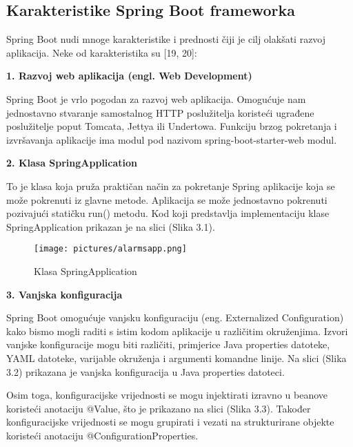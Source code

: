 \documentclass[times, utf8, zavrsni]{fer}
\begin{document}
\subsection{Karakteristike Spring Boot frameworka}
Spring Boot nudi mnoge karakteristike i prednosti čiji je cilj olakšati razvoj aplikacija. Neke od karakteristika su [19, 20]:

\vspace{\baselineskip}

 \textbf{1. Razvoj web aplikacija (engl. Web Development)}
 
 Spring Boot je vrlo pogodan za razvoj web aplikacija. Omogućuje nam jednostavno stvaranje samostalnog HTTP poslužitelja koristeći ugrađene poslužitelje poput Tomcata, Jettya ili Undertowa. Funkciju brzog pokretanja i izvršavanja aplikacije ima modul pod nazivom spring-boot-starter-web modul.

 \vspace{\baselineskip}
\newpage
 \textbf{2. Klasa SpringApplication}
 
 To je klasa koja pruža praktičan način za pokretanje Spring aplikacije koja se može pokrenuti iz glavne metode. Aplikacija se može jednostavno pokrenuti pozivajući statičku run() metodu. Kod koji predstavlja implementaciju klase SpringApplication prikazan je na slici (Slika 3.1).
 
\begin{figure}[h]
			\texttt{[image: pictures/alarmsapp.png]} %
		\centering
			\caption{ Klasa SpringApplication}
			\label{fig:promjene}
\end{figure}

\vspace{\baselineskip}

 \textbf{3. Vanjska konfiguracija} 
 
 Spring Boot omogućuje vanjsku konfiguraciju (eng. Externalized Configuration) kako bismo mogli raditi s istim kodom aplikacije u različitim okruženjima. Izvori vanjske konfiguracije mogu biti različiti, primjerice Java properties datoteke, YAML datoteke, varijable okruženja i argumenti komandne linije. Na slici (Slika 3.2) prikazana je vanjska konfiguracija u Java properties datoteci.

Osim toga, konfiguracijske vrijednosti se mogu injektirati izravno u beanove koristeći anotaciju @Value, što je prikazano na slici (Slika 3.3). Također konfiguracijske vrijednosti se mogu grupirati i vezati na  strukturirane objekte koristeći anotaciju @ConfigurationProperties.
\end{document}
